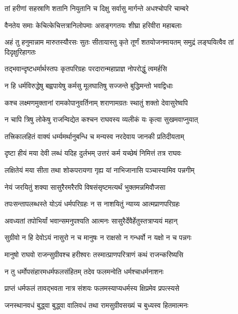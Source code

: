 \twolineshloka
{तां हरीणां सहस्राणि शतानि नियुतानि च}
{दिक्षु सर्वासु मार्गन्ते अधश्चोपरि चाम्बरे} %

\twolineshloka
{वैनतेय समाः केचित्केचित्तत्रानिलोपमाः}
{असङ्गगतयः शीघ्रा हरिवीरा महाबलाः} %

\threelineshloka
{अहं तु हनुमान्नाम मारुतस्यौरसः सुतः}
{सीतायास्तु कृते तूर्णं शतयोजनमायतम्}
{समुद्रं लङ्घयित्वैव तां दिदृक्षुरिहागतः} %

\twolineshloka
{तद्भवान्दृष्टधर्मार्थस्तपः कृतपरिग्रहः}
{परदारान्महाप्राज्ञ नोपरोद्धुं त्वमर्हसि} %

\twolineshloka
{न हि धर्मविरुद्धेषु बह्वपायेषु कर्मसु}
{मूलघातिषु सज्जन्ते बुद्धिमन्तो भवद्विधाः} %

\twolineshloka
{कश्च लक्ष्मणमुक्तानां रामकोपानुवर्तिनाम्}
{शराणामग्रतः स्थातुं शक्तो देवासुरेष्वपि} %

\twolineshloka
{न चापि त्रिषु लोकेषु राजन्विद्येत कश्चन}
{राघवस्य व्यलीकं यः कृत्वा सुखमवाप्नुयात्} %

\twolineshloka
{तत्त्रिकालहितं वाक्यं धर्म्यमर्थानुबन्धि च}
{मन्यस्व नरदेवाय जानकी प्रतिदीयताम्} %

\twolineshloka
{दृष्टा हीयं मया देवी लब्धं यदिह दुर्लभम्}
{उत्तरं कर्म यच्छेषं निमित्तं तत्र राघवः} %

\twolineshloka
{लक्षितेयं मया सीता तथा शोकपरायणा}
{गृह्य यां नाभिजानासि पञ्चास्यामिव पन्नगीम्} %

\twolineshloka
{नेयं जरयितुं शक्या सासुरैरमरैरपि}
{विषसंसृष्टमत्यर्थं भुक्तमन्नमिवौजसा} %

\twolineshloka
{तपःसन्तापलब्धस्ते योऽयं धर्मपरिग्रहः}
{न स नाशयितुं न्याय्य आत्मप्राणपरिग्रहः} %

\twolineshloka
{अवध्यतां तपोभिर्यां भवान्समनुपश्यति}
{आत्मनः सासुरैर्देवैर्हेतुस्तत्राप्ययं महान्} %

\twolineshloka
{सुग्रीवो न हि देवोऽयं नासुरो न च मानुषः}
{न राक्षसो न गन्धर्वो न यक्षो न च पन्नगः} %

\twolineshloka
{मानुषो राघवो राजन्सुग्रीवश्च हरीश्वरः}
{तस्मात्प्राणपरित्राणं कथं राजन्करिष्यसि} %

\twolineshloka
{न तु धर्मोपसंहारमधर्मफलसंहितम्}
{तदेव फलमन्वेति धर्मश्चाधर्मनाशनः} %

\twolineshloka
{प्राप्तं धर्मफलं तावद्भवता नात्र संशयः}
{फलमस्याप्यधर्मस्य क्षिप्रमेव प्रपत्स्यसे} %

\twolineshloka
{जनस्थानवधं बुद्ध्वा बुद्ध्वा वालिवधं तथा}
{रामसुग्रीवसख्यं च बुध्यस्व हितमात्मनः} %

